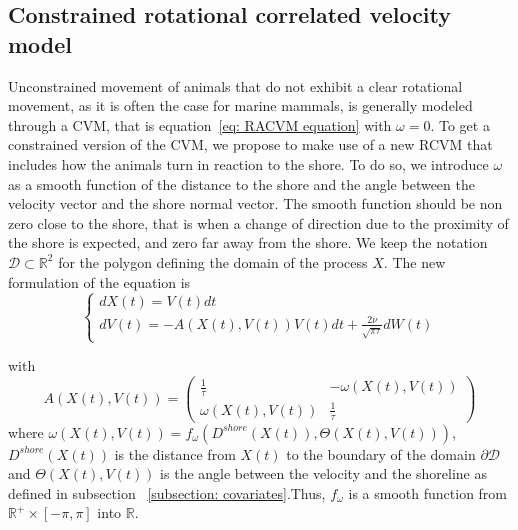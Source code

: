 \documentclass[11pt]{article}
\newcommand {\R}{\mathbb{R}}
\newcommand {\1}{\mathbb{1}}
\begin{document}
\subsection{Constrained rotational correlated velocity model}
\label{section: CRCVM}


Unconstrained movement of animals that do not exhibit a clear rotational movement, as it is often the case for marine mammals, is generally modeled through a CVM, that is equation~\ref{eq: RACVM equation} with $\omega=0$.
To get a constrained version of the CVM, we propose to make use of a new RCVM that includes how the animals turn in reaction to the shore. To do so, we introduce $\omega$ as a smooth function of the distance to the shore and the angle between the velocity vector and the shore normal vector. 
The smooth function should be non zero close to the shore, that is when a change of direction due to the proximity of the shore is expected, and  zero far away from the shore. 
We keep the notation $\mathcal{D} \subset \R^2$ for the polygon defining the domain of the process $X$. The new formulation of the equation is 
\begin{equation} \left\{
	\begin{array}{l}
		dX(t)=V(t) dt \\
		dV(t)=-A(X(t),V(t))V(t)dt+\frac{2\nu}{\sqrt{\pi \tau}} dW(t) 
		
	\end{array}
	\right.
	\label{eq: CRCVM equation}
\end{equation}

with 
\begin{equation} 
		A(X(t),V(t))=\begin{pmatrix} 
			\frac{1}{\tau} & -\omega(X(t),V(t)) \\
			\omega(X(t),V(t)) & \frac{1}{\tau}
		\end{pmatrix}
	\label{eq: CRCVM matrix A}
\end{equation}
where $\omega(X(t),V(t))=f_{\omega}(D^{shore}(X(t)),\Theta(X(t),V(t)))$, $D^{shore}(X(t))$ is the distance from $X(t)$ to the boundary of the domain $\partial \mathcal{D}$
and $\Theta(X(t),V(t))$ is the angle between the velocity and the shoreline as defined in subsection ~\ref{subsection: covariates}.Thus, $f_{\omega}$ is a smooth function from $\R^{+} \times [-\pi,\pi]$ into $\R$.
\end{document}
